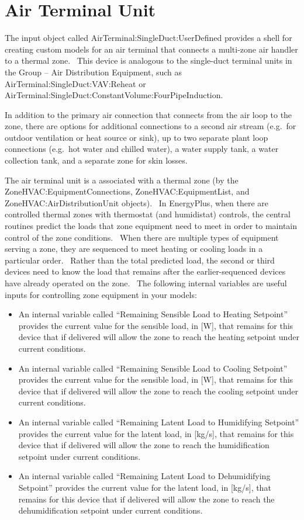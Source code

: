 \section{Air Terminal Unit}\label{air-terminal-unit}

The input object called AirTerminal:SingleDuct:UserDefined provides a shell for creating custom models for an air terminal that connects a multi-zone air handler to a thermal zone.~ This device is analogous to the single-duct terminal units in the Group -- Air Distribution Equipment, such as AirTerminal:SingleDuct:VAV:Reheat or AirTerminal:SingleDuct:ConstantVolume:FourPipeInduction.

In addition to the primary air connection that connects from the air loop to the zone, there are options for additional connections to a second air stream (e.g.~for outdoor ventilation or heat source or sink), up to two separate plant loop connections (e.g.~hot water and chilled water), a water supply tank, a water collection tank, and a separate zone for skin losses.

The air terminal unit is a associated with a thermal zone (by the ZoneHVAC:EquipmentConnections, ZoneHVAC:EquipmentList, and ZoneHVAC:AirDistributionUnit objects).~ In EnergyPlus, when there are controlled thermal zones with thermostat (and humidistat) controls, the central routines predict the loads that zone equipment need to meet in order to maintain control of the zone conditions.~ When there are multiple types of equipment serving a zone, they are sequenced to meet heating or cooling loads in a particular order.~ Rather than the total predicted load, the second or third devices need to know the load that remains after the earlier-sequenced devices have already operated on the zone.~ The following internal variables are useful inputs for controlling zone equipment in your models:

\begin{itemize}
\item
  An internal variable called ``Remaining Sensible Load to Heating Setpoint'' provides the current value for the sensible load, in {[}W{]}, that remains for this device that if delivered will allow the zone to reach the heating setpoint under current conditions.
\item
  An internal variable called ``Remaining Sensible Load to Cooling Setpoint'' provides the current value for the sensible load, in {[}W{]}, that remains for this device that if delivered will allow the zone to reach the cooling setpoint under current conditions.
\item
  An internal variable called ``Remaining Latent Load to Humidifying Setpoint'' provides the current value for the latent load, in {[}kg/s{]}, that remains for this device that if delivered will allow the zone to reach the humidification setpoint under current conditions.
\item
  An internal variable called ``Remaining Latent Load to Dehumidifying Setpoint'' provides the current value for the latent load, in {[}kg/s{]}, that remains for this device that if delivered will allow the zone to reach the dehumidification setpoint under current conditions.
\end{itemize}

